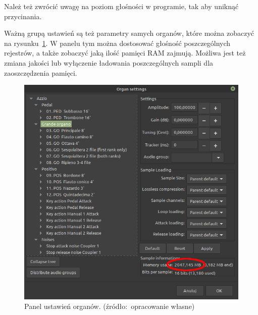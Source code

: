 \documentclass[11pt]{report}
\begin{document}
    Należ też zwrócić uwagę na poziom głośności w programie, tak aby uniknąć przycinania.

    Ważną grupą ustawień są też parametry samych organów, które można zobaczyć na rysunku~\ref{fig:organy}.
    W panelu tym można dostosować głośność poszczególnych rejestrów, a także zobaczyć jaką ilość pamięci RAM zajmują.
    Możliwa jest też zmiana jakości lub wyłączenie ładowania poszczególnych sampli dla zaoszczędzenia pamięci.
    \begin{figure}[!htp]
        \centering
        \includegraphics[width=\linewidth]{fig/organR.png}
        \caption{Panel ustawień organów. (źródło:~opracowanie własne)}
        \label{fig:organy}
    \end{figure}
\end{document}
